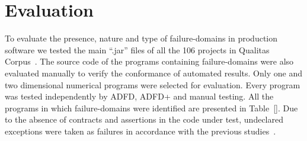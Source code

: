 \documentclass[runningheads,a4paper]{llncs}
\begin{document}



\section{Evaluation} \label{sec:evaluation}
To evaluate the presence, nature and type of failure-domains in production software we tested the main ``.jar'' files of all the 106 projects in Qualitas Corpus~\cite{}. The source code of the programs containing failure-domains were also evaluated manually to verify the conformance of automated results. Only one and two dimensional numerical programs were selected for evaluation. Every program was tested independently by ADFD, ADFD+ and manual testing. All the programs in which failure-domains were identified are presented in Table~\ref{}.  Due to the absence of contracts and assertions in the code under test, undeclared exceptions were taken as failures in accordance with the previous studies~\cite{ahmad2013adfd, Oriol2012}.
\end{document}
